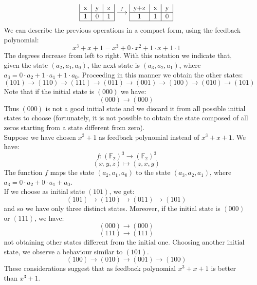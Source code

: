 \documentclass[a4paper, 10pt, titlepage]{article}
\begin{document}
$$\begin{tabular}{|c|c|c|}
x & y & z \\
\hline
1 & 0 & 1 \\
\hline
\end{tabular} \overset{f}\longrightarrow 
\begin{tabular}{|c|c|c|}
y+z & x & y \\
\hline
1 & 1 & 0 \\
\hline
\end{tabular}$$
We can describe the previous operations in a compact form, using the
feedback polynomial:
$$x^3 + x + 1 = x^3 + 0 \cdot x^2 + 1 \cdot x + 1 \cdot 1$$
The degrees decrease from left to right.
With this notation we indicate that, given the state $(a_2, a_1, a_0)$, the next state is $(a_3, a_2, a_1)$, where $a_3 = 0 \cdot a_2 + 1 \cdot a_1 + 1 \cdot a_0$.
Proceeding in this manner we obtain the other states:
$$(101) \rightarrow (110) \rightarrow (111) \rightarrow (011) \rightarrow (001) \rightarrow (100) \rightarrow (010) \rightarrow (101)$$
Note that if the initial state is $(000)$ we have:
$$(000) \rightarrow (000)$$
Thus $(000)$ is not a good initial state and we discard it from all possible initial states to choose (fortunately, it is not possible to obtain the state composed of all zeros starting from a state different from zero). \\
Suppose we have chosen $x^3 + 1$ as feedback polynomial instead of
$x^3 + x + 1$. We have:
$$f : (\mathbb{F}_2)^3 \rightarrow (\mathbb{F}_2)^3$$
$$(x, y, z) \mapsto (z, x ,y)$$
The function $f$ maps the state $(a_2, a_1, a_0)$ to the state $(a_3, a_2, a_1)$, where $a_3 = 0 \cdot a_2 + 0 \cdot a_1 + a_0$. \\
If we choose as initial state $(101)$, we get:
$$(101) \rightarrow (110) \rightarrow (011) \rightarrow (101)$$
and so we have only three distinct states.
Moreover, if the initial state is $(000)$ or $(111)$, we have:
$$(000) \rightarrow (000)$$
$$(111) \rightarrow (111)$$
not obtaining other states different from the initial one. 
Choosing another initial state, we observe a behaviour similar to $(101)$.
$$(100) \rightarrow (010) \rightarrow (001) \rightarrow (100)$$
These considerations suggest that as feedback polynomial $x^3 + x + 1$ is better than $x^3 + 1$.
\end{document}
